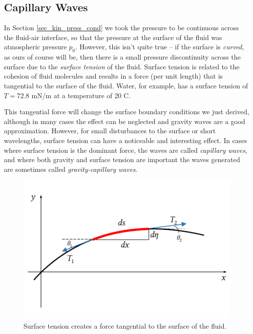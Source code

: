 

\subsection{Capillary Waves}

In Section \ref{sec_kin_press_cond} we took the pressure to be continuous across the fluid-air interface, so that the pressure at the surface of the fluid was atmospheric pressure $p_0$.  However, this isn't quite true -- if the surface is \emph{curved}, as ours of course will be, then there is a small pressure discontinuity across the surface due to the \emph{surface tension} of the fluid.  Surface tension is related to the cohesion of fluid molecules and results in a force (per unit length) that is tangential to the surface of the fluid.  Water, for example, has a surface tension of $T = 72.8$ mN/m at a temperature of 20 C.  

This tangential force will change the surface boundary conditions we just derived, although in many cases the effect can be neglected and gravity waves are a good approximation.  However, for small disturbances to the surface or short wavelengths, surface tension can have a noticeable and interesting effect.  In cases where surface tension is the dominant force, the waves are called \emph{capillary waves}, and where both gravity and surface tension are important the waves generated are sometimes called \emph{gravity-capillary waves}.

\begin{figure}
\centering\includegraphics[width=0.8\linewidth]{Figures/Chapter5/fig_surface_tension}
\caption{Surface tension creates a force tangential to the surface of the fluid.}
\label{fig_surface_tension}
\end{figure}

